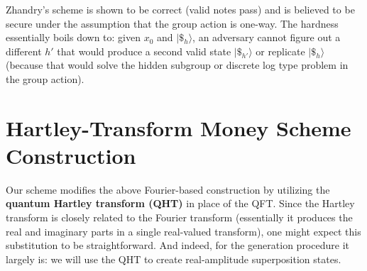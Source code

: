\documentclass[12pt]{report}
\begin{document}
Zhandry’s scheme is shown to be correct (valid notes pass) and is believed to be secure under the assumption that the group action is one-way. The hardness essentially boils down to: given $x_0$ and $|\$_h\rangle$, an adversary cannot figure out a different $h'$ that would produce a second valid state $|\$_{h'}\rangle$ or replicate $|\$_h\rangle$ (because that would solve the hidden subgroup or discrete log type problem in the group action).

\section{Hartley-Transform Money Scheme Construction}
Our scheme modifies the above Fourier-based construction by utilizing the \textbf{quantum Hartley transform (QHT)} in place of the QFT. Since the Hartley transform is closely related to the Fourier transform (essentially it produces the real and imaginary parts in a single real-valued transform), one might expect this substitution to be straightforward. And indeed, for the generation procedure it largely is: we will use the QHT to create real-amplitude superposition states.
\end{document}
